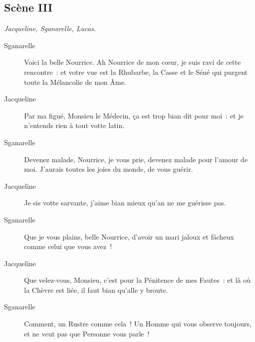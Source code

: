 \documentclass[french,twoside]{book} %
\begin{document}
\subsection[{Scène III}]{Scène III}
\label{III03}
\textit{Jacqueline, Sganarelle, Lucas.}\par
 \begin{description} \item[Sganarelle] 

Voici la belle Nourrice. Ah Nourrice de mon cœur, je suis ravi de cette rencontre : et votre vue est la Rhubarbe, la Casse et le Séné qui purgent toute la Mélancolie de mon Âme.\end{description}
 \begin{description} \item[Jacqueline] 

Par ma figué, Monsieu le Médecin, ça est trop bian dit pour moi : et je n’entends rien à tout votte latin.\end{description}
 \begin{description} \item[Sganarelle] 

Devenez malade, Nourrice, je vous prie, devenez malade pour l’amour de moi. J’aurais toutes les joies du monde, de vous guérir.\end{description}
 \begin{description} \item[Jacqueline] 

Je sis votte sarvante, j’aime bian mieux qu’an ne me guérisse pas.\end{description}
 \begin{description} \item[Sganarelle] 

Que je vous plains, belle Nourrice, d’avoir un mari jaloux et fâcheux comme celui que vous avez !\end{description}
 \begin{description} \item[Jacqueline] 

Que velez-vous, Monsieu, c’est pour la Pénitence de mes Fautes : et là où la Chèvre est liée, il faut bian qu’alle y broute.\end{description}
 \begin{description} \item[Sganarelle] 

Comment, un Rustre comme cela ! Un Homme qui vous observe toujours, et ne veut pas que Personne vous parle !\end{description}
\end{document}
